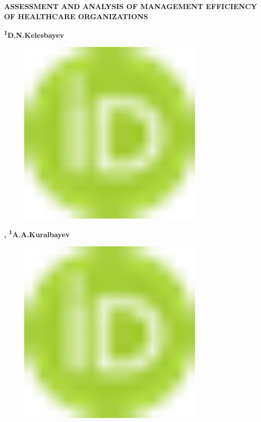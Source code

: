 
{\bfseries ASSESSMENT AND ANALYSIS OF MANAGEMENT EFFICIENCY OF HEALTHCARE
ORGANIZATIONS}

{\bfseries \textsuperscript{1}D.N.Kelesbayev}
\begin{figure}[H]
	\centering
	\includegraphics[width=0.8\textwidth]{media/ekon/image1}
	\caption*{}
\end{figure}
{\bfseries \textsuperscript{\envelope },
\textsuperscript{1}A.A.Kuralbayev}
\begin{figure}[H]
	\centering
	\includegraphics[width=0.8\textwidth]{media/ekon/image1}
	\caption*{}
\end{figure}
